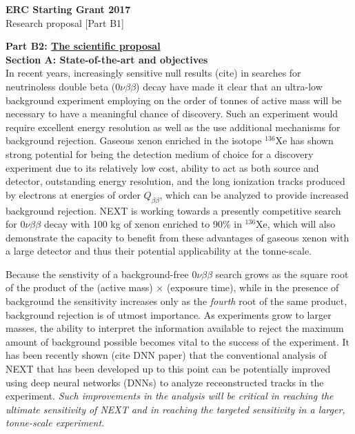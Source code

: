 \documentclass[11pt,a4paper]{article}
\begin{document}


\begin{center}
	\large
	\textbf{ERC Starting Grant 2017}\\
	Research proposal [Part B1]\\[2.0\baselineskip]
\end{center}

\noindent\textbf{Part B2: \underline{The scientific proposal}}\\

{\noindent\textbf{Section A: State-of-the-art and objectives}}\\
In recent years, increasingly sensitive null results (cite) in searches for neutrinoless double beta ($0\nu\beta\beta$) decay have made it clear that an ultra-low background experiment 
employing on the order of tonnes of active mass will be necessary to have a meaningful chance of discovery.  Such an experiment would require excellent energy resolution as well as the use
additional mechanisms for background rejection.  Gaseous xenon enriched in the isotope $^{136}$Xe has shown strong potential for being the 
detection medium of choice for a discovery experiment due to its relatively low cost, ability to act as both source and detector, outstanding energy resolution, and the long ionization 
tracks produced by electrons at energies of order $Q_{\beta\beta}$, which can be analyzed to provide increased background rejection.  NEXT is working towards a presently competitive search 
for $0\nu\beta\beta$ decay with 100 kg of xenon enriched to 90\% in $^{136}$Xe, which will also demonstrate the capacity to benefit from these advantages of gaseous xenon with a 
large detector and thus their potential applicability at the tonne-scale.

Because the senstivity of a background-free $0\nu\beta\beta$ search grows as the square root of the product of the (active mass) $\times$ (exposure time), while in the presence of background the sensitivity increases only as the \emph{fourth} root of the same product, background rejection is of utmost importance. As experiments grow to larger masses, the ability to interpret the information available to reject the maximum amount of background possible becomes vital to the success of the experiment.  It has been recently shown (cite DNN paper) that the conventional analysis of NEXT that has been developed up to this point can be potentially improved using deep neural networks (DNNs) to analyze receonstructed tracks in the experiment. \emph{Such improvements in the analysis will be critical in reaching the ultimate sensitivity of NEXT and in reaching the targeted sensitivity in a larger, tonne-scale experiment.}\\
\end{document}
